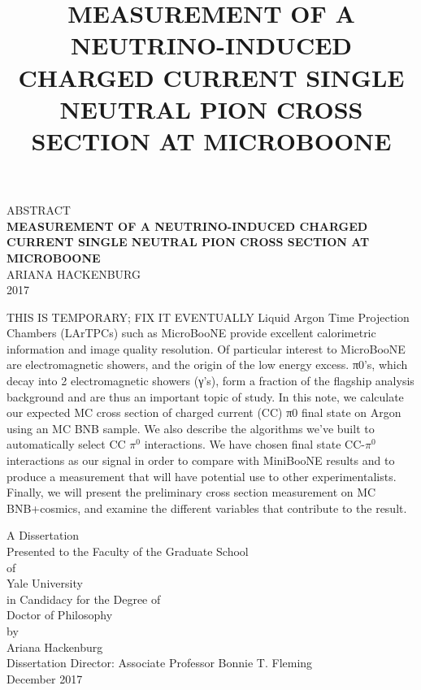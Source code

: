 \documentclass[12pt]{article}
\begin{document}
\begin{center}
{\footnotesize ABSTRACT}\\
\vspace{4 mm}
{\large \textbf{MEASUREMENT OF A NEUTRINO-INDUCED CHARGED CURRENT SINGLE NEUTRAL PION CROSS SECTION AT MICROBOONE}}\\
\vspace{6 mm}
{\footnotesize ARIANA HACKENBURG\\
2017\\}
\end{center}
THIS IS TEMPORARY; FIX IT EVENTUALLY Liquid Argon Time Projection Chambers (LArTPCs) such as MicroBooNE provide excellent calorimetric information and image quality resolution. Of particular interest to MicroBooNE are electromagnetic showers, and the origin of the low energy excess. π0’s, which decay into 2 electromagnetic showers (γ’s), form a fraction of the flagship analysis background and are thus an important topic of study. In this note, we calculate our expected MC cross section of charged current (CC) π0 final state on Argon using an MC BNB sample. We also describe the algorithms we’ve built to automatically select CC $\pi^0$ interactions. We have chosen final state CC-$\pi^0$ interactions as our signal in order to compare with MiniBooNE results and to produce a measurement that will have potential use to other experimentalists. Finally, we will present the preliminary cross section measurement on MC BNB+cosmics, and examine the different variables that contribute to the result.
\thispagestyle{empty}
\clearpage

\singlespacing
\title{MEASUREMENT OF A NEUTRINO-INDUCED CHARGED CURRENT SINGLE NEUTRAL PION CROSS SECTION AT MICROBOONE}
\date{}
\maketitle

\vspace{4 cm}

\begin{center}
A Dissertation \\
Presented to the Faculty of the Graduate School \\
of \\
Yale University \\
in Candidacy for the Degree of \\
Doctor of Philosophy\\ 

\vspace{6 cm}
by \\
Ariana Hackenburg \\
\vspace{3 mm}
Dissertation Director: Associate Professor Bonnie T. Fleming \\
\vspace{3 mm}
December 2017 \\ %
\end{center}
\thispagestyle{empty}
\end{document}
